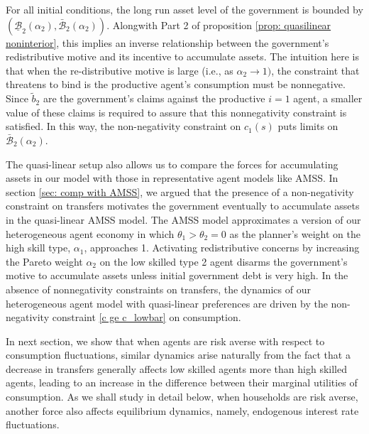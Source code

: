 \documentclass[thmsb,11pt]{article}
\begin{document}
{%
For all initial conditions, the long run asset level of the government is  bounded by $\left( \underline{\mathcal{B}}_{2}\left( \alpha
_{2}\right) ,\mathcal{\bar{\mathcal{B}}}_{2}\left( \alpha _{2}\right)
\right) $. Alongwith Part 2 of proposition \ref{prop: quasilinear noninterior}, this implies an inverse
 relationship between the government's redistributive motive  and its incentive to
accumulate assets. The intuition here is that when  the re-distributive
motive is large (i.e., as  $\alpha _{2}\rightarrow 1)$, the  constraint that threatens to bind
is the productive agent's consumption must be nonnegative. Since $\tilde{b}%
_{2}$ are the government's claims against the productive $i=1$ agent,  a smaller value of these
claims is required to assure that this nonnegativity constraint is satisfied. In this way, the non-negativity constraint on
$c_1(s)$  puts limits on $\bar{\mathcal{B}}_{2}(\alpha _{2})$.


 The quasi-linear setup also allows us to compare the forces for accumulating assets  in our model with those in
   representative agent models like AMSS. In section \ref{sec: comp with AMSS}, we argued that the presence of  a non-negativity constraint on transfers  motivates the government eventually to accumulate  assets in the  quasi-linear AMSS model.  The AMSS  model   approximates a version
   of our heterogeneous agent economy in which $\theta_1 > \theta_2 = 0$ as the planner's weight on the high skill type, $\alpha_1$, approaches 1.  Activating redistributive concerns by increasing the Pareto weight
 $\alpha_2$ on  the low skilled type 2 agent disarms the government's motive  to accumulate assets unless  initial government debt is very high.
 In the absence of nonnegativity  constraints on transfers, the dynamics of our heterogeneous agent model with quasi-linear preferences are driven by the non-negativity constraint \eqref{c ge c_lowbar} on consumption.

 In next section, we show that when agents are
risk averse with respect to consumption fluctuations, similar dynamics arise naturally from the fact that a decrease
in transfers generally affects low skilled agents more than high skilled
agents, leading to an increase in the difference between  their marginal utilities of
consumption. As we shall study in detail below,  when households are risk averse, another
force also affects  equilibrium dynamics, namely, endogenous interest rate fluctuations.

}
\end{document}
